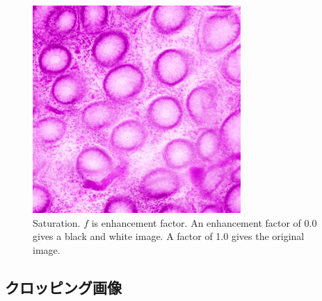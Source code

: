 \begin{figure}[H]
\begin{minipage}{0.25\columnwidth}
	\end{minipage}
	\begin{minipage}{0.25\columnwidth}
		\centering
		\includegraphics[clip, width=\linewidth]{fig/preprocessing/data_aug/color/SATURATION/SATURATION_1_50}
	\end{minipage}	
	
	\caption{Saturation. $f$ is enhancement factor. An enhancement factor of 0.0 gives a black and white image. A factor of 1.0 gives the original image.}
	\label{fig:彩度}
	
\end{figure}

\subsection{クロッピング画像}

